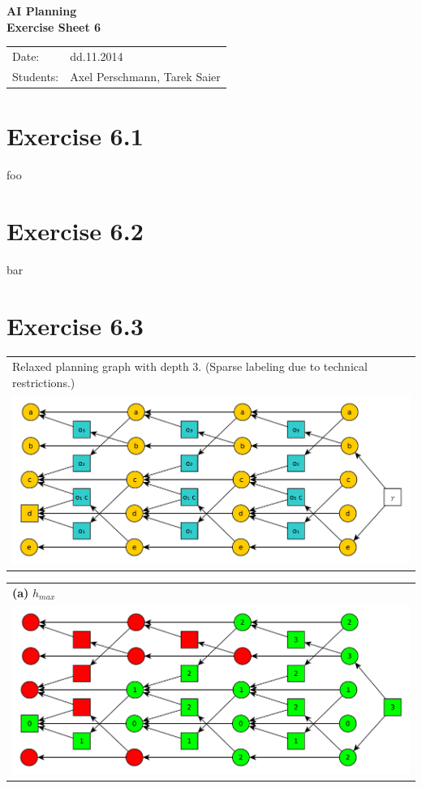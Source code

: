 \documentclass[11pt,a4paper]{article}
\begin{document}
\begin{center}
\Huge{\textbf{AI Planning}}\\
\LARGE{\textbf{Exercise Sheet 6}}
\end{center}
\vspace{2cm}
\begin{tabular}{ll}
Date: & dd.11.2014\\
Students: & Axel Perschmann, Tarek Saier
\end{tabular}

\section*{Exercise 6.1}
foo

\section*{Exercise 6.2}
bar

\section*{Exercise 6.3}
\begin{tabular}{l} %
Relaxed planning graph with depth 3. (Sparse labeling due to technical restrictions.)\\
\includegraphics[scale=0.5]{g63}\\
\end{tabular}

\begin{tabular}{l} %
\textbf{(a)} $h_{max}$\\
\includegraphics[scale=0.5]{g63a}\\
\end{tabular}
\end{document}
